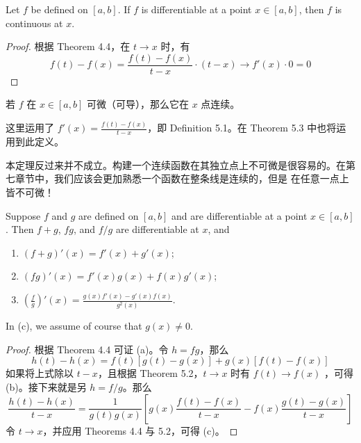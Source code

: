 \documentclass[../poma-notes.tex]{subfiles}
\begin{document}
\begin{theorem}
  Let $f$ be defined on $[a, b]$. If $f$ is differentiable at a point $x \in [a, b]$, then $f$ is continuous
  at $x$.
\end{theorem}

\begin{proof}
  根据 Theorem 4.4，在 $t \to x$ 时，有
  \[
    f(t) - f(x) = \frac{f(t) - f(x)}{t - x} \cdot (t - x) \to f'(x) \cdot 0 = 0
  \]
\end{proof}

\begin{anote}
  若 $f$ 在 $x \in [a, b]$ 可微（可导），那么它在 $x$ 点连续。

  这里运用了 $f'(x) = \frac{f(t) - f(x)}{t - x}$，即 Definition 5.1。在 Theorem 5.3 中也将运用到此定义。
\end{anote}

本定理反过来并不成立。构建一个连续函数在其独立点上不可微是很容易的。在第七章节中，我们应该会更加熟悉一个函数在整条线是连续的，但是
在任意一点上皆不可微！

\begin{theorem}
  Suppose $f$ and $g$ are defined on $[a, b]$ and are differentiable at a point $x \in [a,b]$. Then $f + g$,
  $fg$, and $f/g$ are differentiable at $x$, and
  \begin{enumerate}[label=(\alph*)]
    \item $(f+g)'(x) = f'(x) + g'(x)$;
    \item $(fg)'(x) = f'(x)g(x) + f(x)g'(x)$;
    \item $(\frac{f}{g})'(x) = \frac{g(x)f'(x) - g'(x)f(x)}{g^2(x)}$.
  \end{enumerate}
  In (c), we assume of course that $g(x) \ne 0$.
\end{theorem}

\begin{proof}\mbox{}\par
  根据 Theorem 4.4 可证 (a)。令 $h = fg$，那么
  \[
    h(t) - h(x) = f(t)[g(t) - g(x)] + g(x)[f(t) - f(x)]
  \]
  如果将上式除以 $t - x$，且根据 Theorem 5.2，$t \to x$ 时有 $f(t) \to f(x)$ ，可得 (b)。接下来就是另 $h = f/g$。那么
  \[
    \frac{h(t) - h(x)}{t - x} = \frac{1}{g(t)g(x)} [g(x)\frac{f(t)-f(x)}{t-x} - f(x)\frac{g(t)-g(x)}{t-x}]
  \]
  令 $t \to x$，并应用 Theorems 4.4 与 5.2，可得 (c)。
\end{proof}
\end{document}
